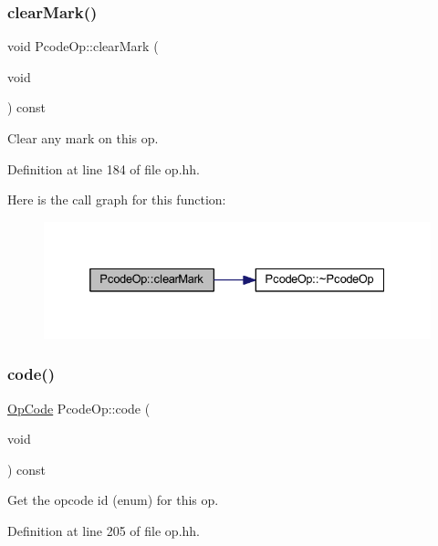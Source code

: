 \subsubsection{\texorpdfstring{clearMark()}{clearMark()}}
{\footnotesize\ttfamily void Pcode\+Op\+::clear\+Mark (\begin{DoxyParamCaption}\item[{void}]{ }\end{DoxyParamCaption}) const\hspace{0.3cm}{\ttfamily [inline]}}



Clear any mark on this op. 



Definition at line 184 of file op.\+hh.

Here is the call graph for this function\+:
\nopagebreak
\begin{figure}[H]
\begin{center}
\leavevmode
\includegraphics[width=332pt]{class_pcode_op_af901dbb8a9dc99db2abab8d3c8ccde2e_cgraph}
\end{center}
\end{figure}
\mbox{\label{class_pcode_op_a4879c54b797d545d0cc149dd8bed7940}} 
\subsubsection{\texorpdfstring{code()}{code()}}
{\footnotesize\ttfamily \mbox{\hyperlink{opcodes_8hh_abeb7dfb0e9e2b3114e240a405d046ea7}{Op\+Code}} Pcode\+Op\+::code (\begin{DoxyParamCaption}\item[{void}]{ }\end{DoxyParamCaption}) const\hspace{0.3cm}{\ttfamily [inline]}}



Get the opcode id (enum) for this op. 



Definition at line 205 of file op.\+hh.

